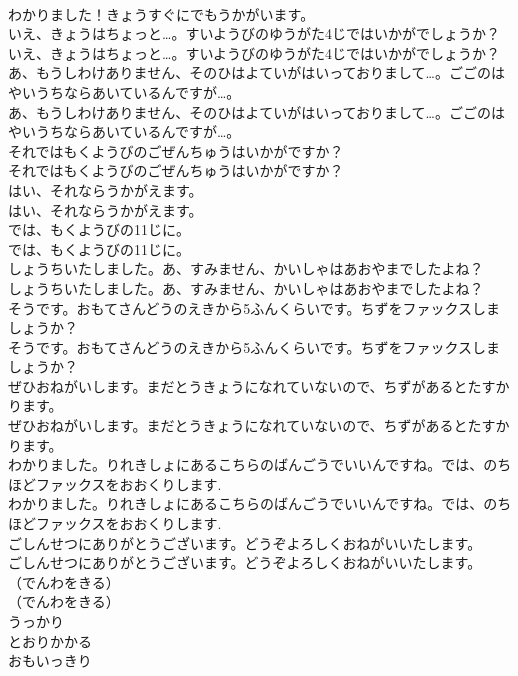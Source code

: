 \documentclass[8pt]{extreport}
\begin{document}
\begin{CJK}{UTF8}{min}
\\	わかりました！きょうすぐにでもうかがいます。
\\	いえ、きょうはちょっと…。すいようびのゆうがた4じではいかがでしょうか？
\\	いえ、きょうはちょっと…。すいようびのゆうがた4じではいかがでしょうか？
\\	あ、もうしわけありません、そのひはよていがはいっておりまして…。ごごのはやいうちならあいているんですが…。
\\	あ、もうしわけありません、そのひはよていがはいっておりまして…。ごごのはやいうちならあいているんですが…。
\\	それではもくようびのごぜんちゅうはいかがですか？
\\	それではもくようびのごぜんちゅうはいかがですか？
\\	はい、それならうかがえます。
\\	はい、それならうかがえます。
\\	では、もくようびの11じに。
\\	では、もくようびの11じに。
\\	しょうちいたしました。あ、すみません、かいしゃはあおやまでしたよね？
\\	しょうちいたしました。あ、すみません、かいしゃはあおやまでしたよね？
\\	そうです。おもてさんどうのえきから5ふんくらいです。ちずをファックスしましょうか？
\\	そうです。おもてさんどうのえきから5ふんくらいです。ちずをファックスしましょうか？
\\	ぜひおねがいします。まだとうきょうになれていないので、ちずがあるとたすかります。
\\	ぜひおねがいします。まだとうきょうになれていないので、ちずがあるとたすかります。
\\	わかりました。りれきしょにあるこちらのばんごうでいいんですね。では、のちほどファックスをおおくりします.
\\	わかりました。りれきしょにあるこちらのばんごうでいいんですね。では、のちほどファックスをおおくりします.
\\	ごしんせつにありがとうございます。どうぞよろしくおねがいいたします。
\\	ごしんせつにありがとうございます。どうぞよろしくおねがいいたします。
\\	（でんわをきる）
\\	（でんわをきる）
\\	うっかり
\\	とおりかかる
\\	おもいっきり

\end{CJK}
\end{document}
